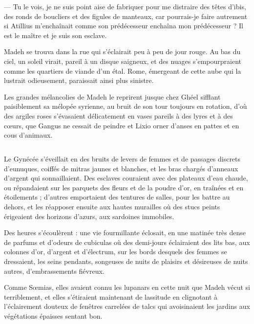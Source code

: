 \documentclass[a4paper, 11pt, oneside, polutonikogreek, french]{article}
\begin{document}
--- Tu le vois, je ne suis point aise de fabriquer pour me distraire des têtes d'ibis, des ronds de boucliers et des figules de manteaux, car pourrais-je faire autrement si Atillius m'enchaînait comme son prédécesseur enchaîna mon prédécesseur ? Il est le maître et je suis son esclave.

Madeh se trouva dans la rue qui s'éclairait peu à peu de jour rouge. Au bas du ciel, un soleil virait, pareil à un disque saigneux, et des nuages s'empourpraient comme les quartiers de viande d'un étal. Rome, émergeant de cette aube qui la lustrait odieusement, paraissait ainsi plus sinistre.

Les grandes mélancolies de Madeh le reprirent jusque chez Ghéel sifflant paisiblement sa mélopée syrienne, au bruit de son tour toujours en rotation, d'où des argiles roses s'évasaient délicatement en vases pareils à des lyres et à des cœurs, que Gangus ne cessait de peindre et Lixio orner d'anses en pattes et en cous d'animaux.
\clearpage
\subsection{}
\paragraph{}
Le Gynécée s'éveillait en des bruits de levers de femmes et de passages discrets d'eunuques, coiffés de mitras jaunes et blanches, et les bras chargés d'anneaux d'argent qui sonnaillaient. Des esclaves couraient avec des plateaux d'eau chaude, ou répandaient sur les parquets des fleurs et de la poudre d'or, en traînées et en étoilements ; d'autres emportaient des tentures de salles, pour les battre au dehors, et les réapposer ensuite aux hautes murailles où des stucs peints érigeaient des horizons d'azurs, aux sardoines immobiles.

Des heures s'écoulèrent : une vie fourmillante éclosait, en une matinée très dense de parfums et d'odeurs de cubiculas où des demi-jours éclairaient des lits bas, aux colonnes d'or, d'argent et d'électrum, sur les bords desquels des femmes se dressaient, les seins pendants, songeuses de nuits de plaisirs et désireuses de nuits autres, d'embrassements fiévreux.

Comme Sœmias, elles avaient connu les lupanars en cette nuit que Madeh vécut si terriblement, et elles s'étiraient maintenant de lassitude en clignotant à l'éclairement douteux de fenêtres carrelées de talcs qui avoisinaient les jardins aux végétations épaisses sentant bon.
\end{document}
